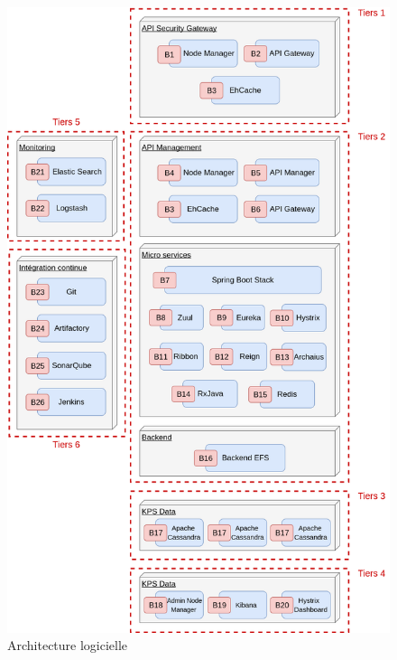 \begin{figure}[h]
	\includegraphics[scale=0.5]{images/travailNeuflizeOBC/architecture/architectureLogicielle.png}
	\centering
	\caption{Architecture logicielle}
	\label{archiLog}
\end{figure}

\newpage